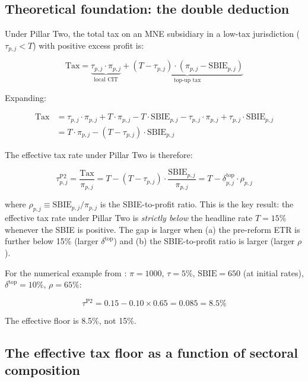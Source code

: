 \documentclass[11pt,a4paper]{article}
\begin{document}
\subsection{Theoretical foundation: the double deduction}\label{sec:double_deduction}

Under Pillar Two, the total tax on an MNE subsidiary in a low-tax jurisdiction ($\tau_{p,j} < T$) with positive excess profit is:

\begin{equation}\label{eq:total_tax}
\text{Tax} = \underbrace{\tau_{p,j} \cdot \pi_{p,j}}_{\text{local CIT}} + \underbrace{(T - \tau_{p,j}) \cdot (\pi_{p,j} - \text{SBIE}_{p,j})}_{\text{top-up tax}}
\end{equation}

Expanding:

\begin{align}
\text{Tax} &= \tau_{p,j} \cdot \pi_{p,j} + T \cdot \pi_{p,j} - T \cdot \text{SBIE}_{p,j} - \tau_{p,j} \cdot \pi_{p,j} + \tau_{p,j} \cdot \text{SBIE}_{p,j} \nonumber \\
&= T \cdot \pi_{p,j} - (T - \tau_{p,j}) \cdot \text{SBIE}_{p,j} \label{eq:total_tax_simplified}
\end{align}

The effective tax rate under Pillar Two is therefore:

\begin{equation}\label{eq:etr_pillar2}
\tau_{p,j}^{\text{P2}} = \frac{\text{Tax}}{\pi_{p,j}} = T - (T - \tau_{p,j}) \cdot \frac{\text{SBIE}_{p,j}}{\pi_{p,j}} = T - \delta_{p,j}^{\text{top}} \cdot \rho_{p,j}
\end{equation}

where $\rho_{p,j} \equiv \text{SBIE}_{p,j} / \pi_{p,j}$ is the SBIE-to-profit ratio. This is the key result: the effective tax rate under Pillar Two is \emph{strictly below} the headline rate $T = 15\%$ whenever the SBIE is positive. The gap is larger when (a) the pre-reform ETR is further below 15\% (larger $\delta^{\text{top}}$) and (b) the SBIE-to-profit ratio is larger (larger $\rho$).

For the numerical example from \citet{schjelderup2024}: $\pi = 1000$, $\tau = 5\%$, $\text{SBIE} = 650$ (at initial rates), $\delta^{\text{top}} = 10\%$, $\rho = 65\%$:

\[
\tau^{\text{P2}} = 0.15 - 0.10 \times 0.65 = 0.085 = 8.5\%
\]

The effective floor is 8.5\%, not 15\%.

\subsection{The effective tax floor as a function of sectoral composition}\label{sec:floor}
\end{document}
